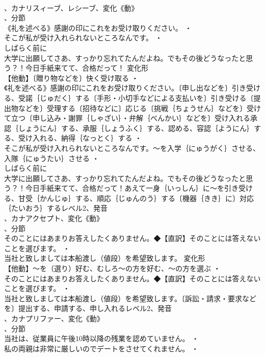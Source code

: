 \documentclass[8pt]{extreport}
\begin{document}
\begin{CJK}{UTF8}{min}
\\	、カナリスィーブ、レシーブ、変化《動》
\\	、分節
\\	《礼を述べる》感謝の印にこれをお受け取りください。 ・
\\	そこが私が受け入れられないところなんです。 ・
\\	しばらく前に
\\	大学に出願してさあ、すっかり忘れてたんだよね。でもその後どうなったと思う？！今日手紙来てて、合格だって！	変化形 
\\	【他動】〔贈り物などを〕快く受け取る ・
\\	《礼を述べる》感謝の印にこれをお受け取りください。〔申し出などを〕引き受ける、受諾｛じゅだく｝する〔手形・小切手などによる支払いを〕引き受ける〔提出物などを〕受理する〔招待などに〕応じる〔挑戦｛ちょうせん｝などを〕受けて立つ〔申し込み・謝罪｛しゃざい｝・弁解｛べんかい｝などを〕受け入れる承認｛しょうにん｝する、承服｛しょうふく｝する、認める、容認｛ようにん｝する、受け入れる、納得｛なっとく｝する ・
\\	そこが私が受け入れられないところなんです。～を入学｛にゅうがく｝させる、入隊｛にゅうたい｝させる ・
\\	しばらく前に
\\	大学に出願してさあ、すっかり忘れてたんだよね。でもその後どうなったと思う？！今日手紙来てて、合格だって！あえて一身｛いっしん｝に～を引き受ける、甘受｛かんじゅ｝する、順応｛じゅんのう｝する〔機器｛きき｝に〕対応｛たいおう｝するレベル2、発音
\\	、カナアクセプト、変化《動》
\\	、分節
\\	そのことにはあまりお答えしたくありません。◆【直訳】そのことには答えないことを選びます。 ・
\\	当社と致しましては本船渡し（値段）を希望致します。	変化形 
\\	【他動】～を（選り）好む、むしろ～の方を好む、～の方を選ぶ ・
\\	そのことにはあまりお答えしたくありません。◆【直訳】そのことには答えないことを選びます。 ・
\\	当社と致しましては本船渡し（値段）を希望致します。〔訴訟・請求・要求などを〕提出する、申請する、申し入れるレベル2、発音
\\	、カナプリファー、変化《動》
\\	、分節
\\	当社は、従業員に午後10時以降の残業を認めていません。 ・
\\	私の両親は非常に厳しいのでデートをさせてくれません。 ・

\end{CJK}
\end{document}
